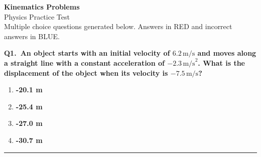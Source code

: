 \documentclass[11pt]{article}
\newcommand{\QuestionStyle}[1]{{\large\bfseries\boldmath #1}}
\newcommand{\AnswerStyle}[1]{{\large\bfseries\boldmath #1}}
\newcommand{\ReasonStyle}[1]{{\normalsize #1}}
\newif\ifshowreason
\newcommand{\Correct}[2]{%
  \item \AnswerStyle{\textcolor{AnsRed}{#1}}%
  \ifshowreason\\[-0.2em]
    \ReasonStyle{\textcolor{AnsRed}{#2}}%
  \fi
}
\newcommand{\Wrong}[2]{%
  \item \AnswerStyle{\textcolor{WrongBlue}{#1}}%
  \ifshowreason\\[-0.2em]
    \ReasonStyle{\textcolor{WrongBlue}{#2}}%
  \fi
}
\newcommand{\QBlock}[3]{%
  \Needspace{8\baselineskip}%
  \noindent
  \begin{minipage}{\linewidth}
    \QuestionStyle{#1.~#2}

    \vspace{0.25em}
    \begin{enumerate}
      #3
    \end{enumerate}

    \vspace{0.25em}
    \hrule height 0.4pt
  \end{minipage}
  \vspace{0.75em}
}
\begin{document}
\begin{center}
{\huge \textbf{Kinematics Problems}}\\[0.25em]
{\Large Physics Practice Test}\\[0.25em]
{\large Multiple choice questions generated below. Answers in RED and incorrect answers in BLUE.}
\end{center}

\vspace{0.75em}


\QBlock{Q1}{An object starts with an initial velocity of $6.2 \, \text{m/s}$ and moves along a straight line with a constant acceleration of $-2.3 \, \text{m/s}^2$. What is the displacement of the object when its velocity is $-7.5 \, \text{m/s}$?}{
  \Wrong{-20.1 m}{This answer results from using incorrect signs for the initial and final velocities.}
  \Wrong{-25.4 m}{This answer occurs from ignoring the negative sign in acceleration.}
  \Correct{-27.0 m}{To find the displacement, use the equation $v^2 = u^2 + 2as$, where $v = -7.5 \, \text{m/s}$, $u = 6.2 \, \text{m/s}$, and $a = -2.3 \, \text{m/s}^2$. Solving for $s$, $s = \frac{v^2 - u^2}{2a}$ yields $s = \frac{(-7.5)^2 - (6.2)^2}{2 \times (-2.3)} = -27.0 \, \text{m}$. This result is the correct displacement.}
  \Wrong{-30.7 m}{This option assumes acceleration was positive, affecting the calculation of displacement.}
}
\end{document}
